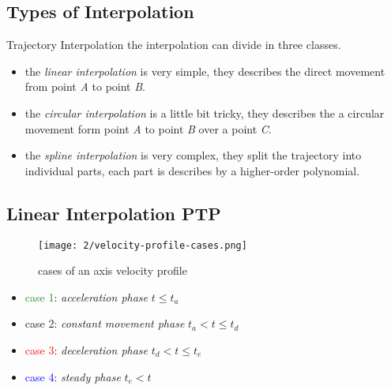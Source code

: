 \documentclass[%
  professionalfonts,%
  xcolor={%
    usenames,%
    dvipsnames,%
    svgnames,%
    table,%
    hyperref%
  }%
]{beamer}
\begin{document}
\subsection{Types of Interpolation}
\begin{frame}{Trajectory Interpolation}
the interpolation can divide in three classes.
\begin{itemize}
\item the \emph{linear interpolation} is very simple, they describes the direct movement from point \emph{A} to point \emph{B}.
\item the \emph{circular interpolation} is a little bit tricky, they describes the a circular movement form point \emph{A} to point \emph{B} over a point \emph{C}.
\item the \emph{spline interpolation} is very complex, they split the trajectory into individual parts, each part is describes by a higher-order polynomial.
\end{itemize}
\end{frame}

\subsection{Linear Interpolation PTP}
%


\begin{frame}
  \begin{figure}[h]
    \texttt{[image: 2/velocity-profile-cases.png]}
    \caption{cases of an axis velocity profile}
    \label{fig:ti-movement-cases}
  \end{figure}
  
  \begin{itemize}
    \item \textcolor{ForestGreen}{case 1}: \emph{acceleration phase} $t \leq t_{a}$
    \item \textcolor{Dandelion}{case 2}: \emph{constant movement phase} $t_{a} < t \leq t_{d}$
    \item \textcolor{red}{case 3}: \emph{deceleration phase} $t_{d} < t \leq t_{e}$
    \item \textcolor{blue}{case 4}: \emph{steady phase} $t_{e} < t$
  \end{itemize}
\end{frame}
\end{document}
